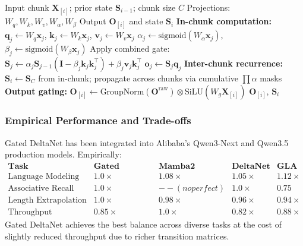 \begin{algorithm}[H]
\caption{Gated DeltaNet Parallel Chunkwise Forward}
\begin{algorithmic}[1]
\Require Input chunk  $\mathbf{X}_{[i]}$; prior state $\mathbf{S}_{i-1}$; chunk size $C$
\Require Projections: $W_q, W_k, W_v, W_\alpha, W_\beta$
\Ensure Output $\mathbf{O}_{[i]}$ and state $\mathbf{S}_i$
\State \textbf{In-chunk computation:}
    \State $\mathbf{q}_j \gets W_q \mathbf{x}_j$, $\mathbf{k}_j \gets W_k \mathbf{x}_j$, $\mathbf{v}_j \gets W_v \mathbf{x}_j$
    \State $\alpha_j \gets \text{sigmoid}(W_\alpha \mathbf{x}_j)$, $\beta_j \gets \text{sigmoid}(W_\beta \mathbf{x}_j)$
    \State Apply combined gate: $\mathbf{S}_j \gets \alpha_j \mathbf{S}_{j-1}(\mathbf{I} - \beta_j \mathbf{k}_j \mathbf{k}_j^\top) + \beta_j \mathbf{v}_j \mathbf{k}_j^\top$
    \State $\mathbf{o}_j \gets \mathbf{S}_j \mathbf{q}_j$
\EndFor
\State \textbf{Inter-chunk recurrence:}
\State $\mathbf{S}_i \gets \mathbf{S}_C$ from in-chunk; propagate across chunks via cumulative $\prod \alpha$ masks
\State \textbf{Output gating:} $\mathbf{O}_{[i]} \gets \text{GroupNorm}(\mathbf{O}^\text{raw}) \otimes \text{SiLU}(W_g \mathbf{X}_{[i]})$
\Return $\mathbf{O}_{[i]}$, $\mathbf{S}_i$
\end{algorithmic}
\end{algorithm}

\subsubsection{Empirical Performance and Trade-offs}

Gated DeltaNet has been integrated into Alibaba's Qwen3-Next and Qwen3.5 production models. Empirically:
\[
\begin{array}{l|cccc}
\textbf{Task} & \textbf{Gated DeltaNet} & \textbf{Mamba2} & \textbf{DeltaNet} & \textbf{GLA} \\
\hline
\text{Language Modeling} & \mathbf{1.0\times} & 1.08\times & 1.05\times & 1.12\times \\
\text{Associative Recall} & \mathbf{1.0\times} & --(no perfect) & \mathbf{1.0\times} & 0.75 \\
\text{Length Extrapolation} & \mathbf{1.0\times} & 0.98\times & 0.96\times & 0.94\times \\
\text{Throughput (tokens/sec)} & 0.85\times & \mathbf{1.0\times} & 0.82\times & 0.88\times
\end{array}
\]
Gated DeltaNet achieves the best balance across diverse tasks at the cost of slightly reduced throughput due to richer transition matrices.

